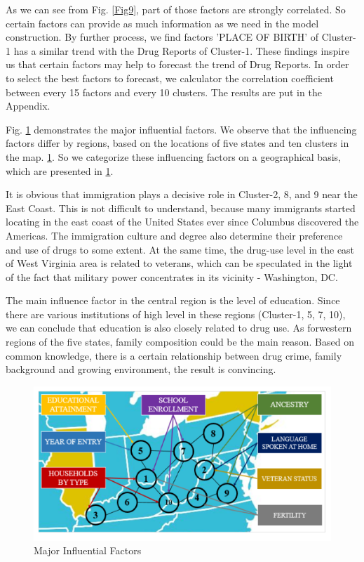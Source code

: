 \documentclass[12pt]{article}
\begin{document}
As we can see from Fig. \ref{Fig9}, part of those factors are strongly correlated. So certain factors can provide as much information as we need in the model construction. By further process, we find factors 'PLACE OF BIRTH' of Cluster-1 has a similar trend with the Drug Reports of Cluster-1. These findings inspire us that certain factors may help to forecast the trend of Drug Reports. In order to select the best factors to forecast, we calculator the correlation coefficient between every 15 factors and every 10 clusters. The results are put in the Appendix.

Fig. \ref{Fig11} demonstrates the major influential factors. We observe that the influencing factors differ by regions, based on the locations of five states and ten clusters in the map. \ref{Fig11}. So we categorize these influencing factors on a geographical basis, which are presented in \ref{Fig11}.

It is obvious that immigration plays a decisive role in Cluster-2, 8, and 9 near the East Coast. This is not difficult to understand, because many immigrants started locating in the east coast of the United States ever since Columbus discovered the Americas. The immigration culture and degree also determine their preference and use of drugs to some extent. At the same time, the drug-use level in the east of West Virginia area is related to veterans, which can be speculated in the light of the fact that military power concentrates in its vicinity - Washington, DC. 

The main influence factor in the central region is the level of education. Since there are various institutions of high level in these regions (Cluster-1, 5, 7, 10), we can conclude that education is also closely related to drug use. As forwestern regions of the five states, family composition could be the main reason. Based on common knowledge, there is a certain relationship between drug crime, family background and growing environment, the result is convincing.

\begin{figure}[H]
	\centering
	\includegraphics[scale=0.7]{./figures/11.png}
	\caption{Major Influential Factors}
	\label{Fig11}
\end{figure}
\end{document}
